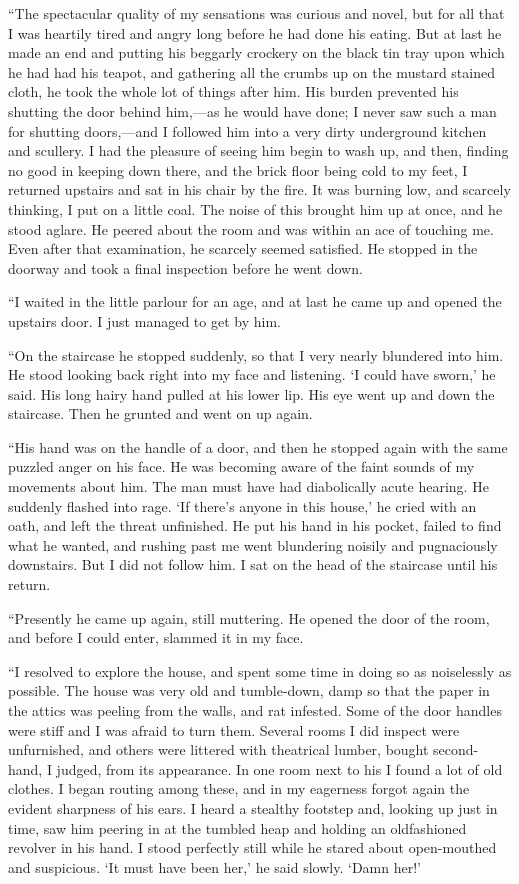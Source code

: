 “The spectacular quality of my sensations was curious and novel, but for all that I was heartily tired and angry long before he had done his eating. But at last he made an end and putting his beggarly crockery on the black tin tray upon which he had had his teapot, and gathering all the crumbs up on the mustard stained cloth, he took the whole lot of things after him. His burden prevented his shutting the door behind him,—as he would have done; I never saw such a man for shutting doors,—and I followed him into a very dirty underground kitchen and scullery. I had the pleasure of seeing him begin to wash up, and then, finding no good in keeping down there, and the brick floor being cold to my feet, I returned upstairs and sat in his chair by the fire. It was burning low, and scarcely thinking, I put on a little coal. The noise of this brought him up at once, and he stood aglare. He peered about the room and was within an ace of touching me. Even after that examination, he scarcely seemed satisfied. He stopped in the doorway and took a final inspection before he went down.

{“I waited in the little parlour for an age, and at last he came up and opened the upstairs door. I just managed to get by him.}

“On the staircase he stopped suddenly, so that I very nearly blundered into him. He stood looking back right into my face and listening. ‘I could have sworn,’ he said. His long hairy hand pulled at his lower lip. His eye went up and down the staircase. Then he grunted and went on up again.

“His hand was on the handle of a door, and then he stopped again with the same puzzled anger on his face. He was becoming aware of the faint sounds of my movements about him. The man must have had diabolically acute hearing. He suddenly flashed into rage. ‘If there’s anyone in this house,’ he cried with an oath, and left the threat unfinished. He put his hand in his pocket, failed to find what he wanted, and rushing past me went blundering noisily and pugnaciously downstairs. But I did not follow him. I sat on the head of the staircase until his return.

“Presently he came up again, still muttering. He opened the door of the room, and before I could enter, slammed it in my face.

“I resolved to explore the house, and spent some time in doing so as noiselessly as possible. The house was very old and tumble-down, damp so that the paper in the attics was peeling from the walls, and rat infested. Some of the door handles were stiff and I was afraid to turn them. Several rooms I did inspect were unfurnished, and others were littered with theatrical lumber, bought second-hand, I judged, from its appearance. In one room next to his I found a lot of old clothes. I began routing among these, and in my eagerness forgot again the evident sharpness of his ears. I heard a stealthy footstep and, looking up just in time, saw him peering in at the tumbled heap and holding an oldfashioned revolver in his hand. I stood perfectly still while he stared about open-mouthed and suspicious. ‘It must have been her,’ he said slowly. ‘Damn her!’

